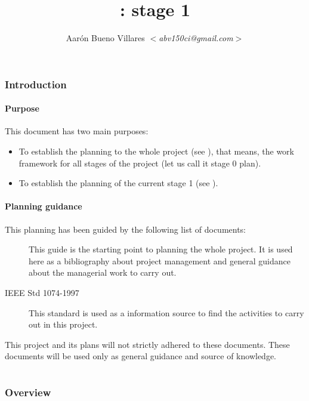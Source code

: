 \documentclass[twocolumn, 9pt]{extarticle}
\title{\fav: \favpl stage 1}
\author{Aarón Bueno Villares \textit{$<$abv150ci@gmail.com$>$}}
\begin{document}
\twocolumn[
  \maketitle
]

\tableofcontents

\section{Introduction}
\subsection{Purpose}
This document has two main purposes:

\begin{itemize}
\item To establish the planning to the whole project (see
  ), that means, the work framework for all
  stages of the project (let us call it stage 0 plan).
\item To establish the planning of the current stage 1 (see
  ).
\end{itemize}

\subsection{Planning guidance}
This planning has been guided by the following list of documents:

\begin{description}
  \item[\pmbok] This guide is the starting point to planning the
    whole project. It is used here as a bibliography about project
    management and general guidance about the managerial work to carry
    out.
  \item[IEEE Std 1074-1997] This standard is used as a information
    source to find the activities to carry out in this project.
\end{description}

This project and its plans will not strictly adhered to these
documents. These documents will be used only as general guidance and
source of knowledge.

\part{\favpl}
\label{part:st0-plan}

\section{Overview}
\end{document}
